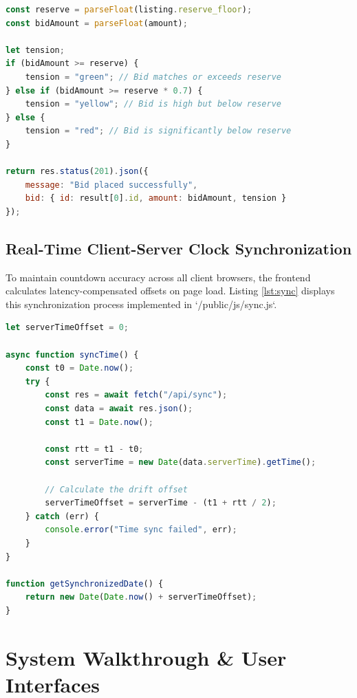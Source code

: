 \documentclass[12pt,a4paper,oneside]{report}
\begin{document}
\begin{lstlisting}[language=JavaScript, label={lst:tension}, caption={Server Tension Logic}]
const reserve = parseFloat(listing.reserve_floor);
const bidAmount = parseFloat(amount);

let tension;
if (bidAmount >= reserve) {
    tension = "green"; // Bid matches or exceeds reserve
} else if (bidAmount >= reserve * 0.7) {
    tension = "yellow"; // Bid is high but below reserve
} else {
    tension = "red"; // Bid is significantly below reserve
}

return res.status(201).json({
    message: "Bid placed successfully",
    bid: { id: result[0].id, amount: bidAmount, tension }
});
\end{lstlisting}

\section{Real-Time Client-Server Clock Synchronization}
To maintain countdown accuracy across all client browsers, the frontend calculates latency-compensated offsets on page load. Listing \ref{lst:sync} displays this synchronization process implemented in `/public/js/sync.js`.

\begin{lstlisting}[language=JavaScript, label={lst:sync}, caption={Frontend Clock Synchronization with Network Compensation}]
let serverTimeOffset = 0;

async function syncTime() {
    const t0 = Date.now();
    try {
        const res = await fetch("/api/sync");
        const data = await res.json();
        const t1 = Date.now();
        
        const rtt = t1 - t0;
        const serverTime = new Date(data.serverTime).getTime();
        
        // Calculate the drift offset
        serverTimeOffset = serverTime - (t1 + rtt / 2);
    } catch (err) {
        console.error("Time sync failed", err);
    }
}

function getSynchronizedDate() {
    return new Date(Date.now() + serverTimeOffset);
}
\end{lstlisting}

\chapter{System Walkthrough \& User Interfaces}
\end{document}
